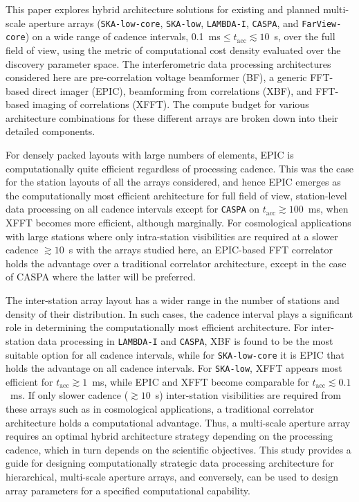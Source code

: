 \documentclass[
  journal=pasa,
  manuscript=article-type,
  year=2020,
  volume=37,
]{cup-journal}
\begin{document}
This paper explores hybrid architecture solutions for existing and planned multi-scale aperture arrays (\texttt{SKA-low-core}, \texttt{SKA-low}, \texttt{LAMBDA-I}, \texttt{CASPA}, and \texttt{FarView-core}) on a wide range of cadence intervals, 0.1~ms$\le t_\textrm{acc} \lesssim 10$~s, over the full field of view, using the metric of computational cost density evaluated over the discovery parameter space. The interferometric data processing architectures considered here are pre-correlation voltage beamformer (BF), a generic FFT-based direct imager (EPIC), beamforming from correlations (XBF), and FFT-based imaging of correlations (XFFT). The compute budget for various architecture combinations for these different arrays are broken down into their detailed components. 

For densely packed layouts with large numbers of elements, EPIC is computationally quite efficient regardless of processing cadence. This was the case for the station layouts of all the arrays considered, and hence EPIC emerges as the computationally most efficient architecture for full field of view, station-level data processing on all cadence intervals except for \texttt{CASPA} on $t_\textrm{acc}\gtrsim 100$~ms, when XFFT becomes more efficient, although marginally. For cosmological applications with large stations where only intra-station visibilities are required at a slower cadence $\gtrsim 10$~s with the arrays studied here, an EPIC-based FFT correlator holds the advantage over a traditional correlator architecture, except in the case of CASPA where the latter will be preferred.

The inter-station array layout has a wider range in the number of stations and density of their distribution. In such cases, the cadence interval plays a significant role in determining the computationally most efficient architecture. For inter-station data processing in \texttt{LAMBDA-I} and \texttt{CASPA}, XBF is found to be the most suitable option for all cadence intervals, while for \texttt{SKA-low-core} it is EPIC that holds the advantage on all cadence intervals. For \texttt{SKA-low}, XFFT appears most efficient for $t_\textrm{acc}\gtrsim 1$~ms, while EPIC and XFFT become comparable for $t_\textrm{acc}\lesssim 0.1$~ms. If only slower cadence ($\gtrsim 10$~s) inter-station visibilities are required from these arrays such as in cosmological applications, a traditional correlator architecture holds a computational advantage. Thus, a multi-scale aperture array requires an optimal hybrid architecture strategy depending on the processing cadence, which in turn depends on the scientific objectives. This study provides a guide for designing computationally strategic data processing architecture for hierarchical, multi-scale aperture arrays, and conversely, can be used to design array parameters for a specified computational capability. 
\end{document}
